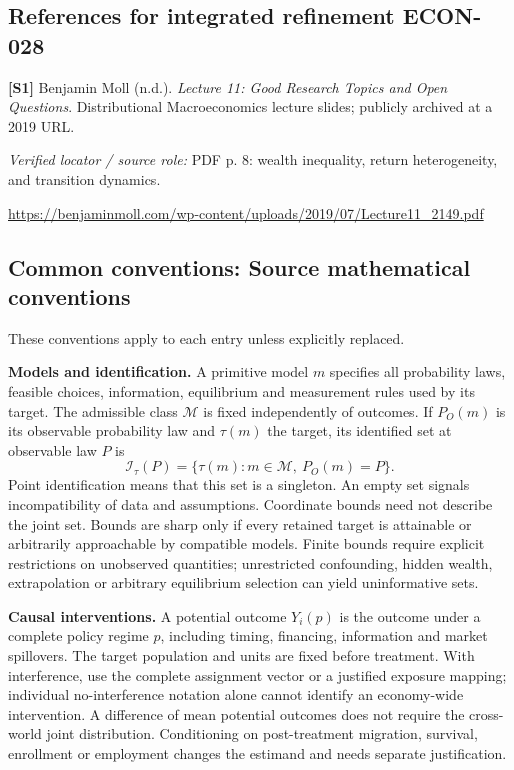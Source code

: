 \documentclass[11pt,a4paper]{article}
\begin{document}
\subsection*{References for integrated refinement ECON-028}
{\footnotesize\raggedright
\par\noindent\textbf{[S1]} Benjamin Moll (n.d.). \emph{Lecture 11: Good Research Topics and Open Questions}. Distributional Macroeconomics lecture slides; publicly archived at a 2019 URL.\par \textit{Verified locator / source role:} PDF p. 8: wealth inequality, return heterogeneity, and transition dynamics.\par \url{https://benjaminmoll.com/wp-content/uploads/2019/07/Lecture11_2149.pdf}\par\smallskip
}

\subsection*{Common conventions: Source mathematical conventions}

These conventions apply to each entry unless explicitly replaced.

\textbf{Models and identification.} A primitive model \(m\) specifies all probability laws, feasible choices, information, equilibrium and measurement rules used by its target. The admissible class \(\mathcal M\) is fixed independently of outcomes. If \(P_O(m)\) is its observable probability law and \(\tau(m)\) the target, its identified set at observable law \(P\) is
\[
 \mathcal I_\tau(P)=\{\tau(m):m\in\mathcal M,\ P_O(m)=P\}.
\]
Point identification means that this set is a singleton. An empty set signals incompatibility of data and assumptions. Coordinate bounds need not describe the joint set. Bounds are sharp only if every retained target is attainable or arbitrarily approachable by compatible models. Finite bounds require explicit restrictions on unobserved quantities; unrestricted confounding, hidden wealth, extrapolation or arbitrary equilibrium selection can yield uninformative sets.

\textbf{Causal interventions.} A potential outcome \(Y_i(p)\) is the outcome under a complete policy regime \(p\), including timing, financing, information and market spillovers. The target population and units are fixed before treatment. With interference, use the complete assignment vector or a justified exposure mapping; individual no-interference notation alone cannot identify an economy-wide intervention. A difference of mean potential outcomes does not require the cross-world joint distribution. Conditioning on post-treatment migration, survival, enrollment or employment changes the estimand and needs separate justification.
\end{document}
